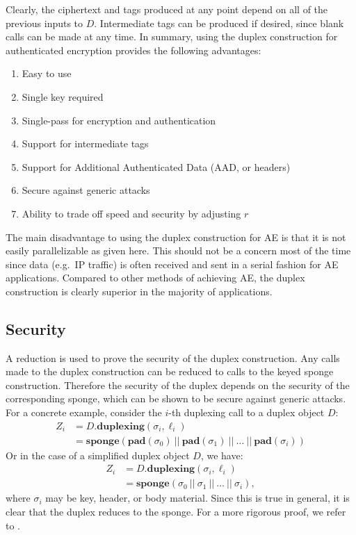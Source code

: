 Clearly, the ciphertext and tags produced at any point depend on all of the previous inputs to $D$.
Intermediate tags can be produced if desired, since blank calls can be made at any time.
In summary, using the duplex construction for authenticated encryption provides the following advantages:
\begin{enumerate}
\item Easy to use
\item Single key required
\item Single-pass for encryption and authentication
\item Support for intermediate tags
\item Support for Additional Authenticated Data (AAD, or headers)
\item Secure against generic attacks
\item Ability to trade off speed and security by adjusting $r$
\end{enumerate}
The main disadvantage to using the duplex construction for AE is that it is not easily parallelizable as given here.
This should not be a concern most of the time since data (e.g.\ IP traffic) is often received and sent in a serial fashion for AE applications.
Compared to other methods of achieving AE, the duplex construction is clearly superior in the majority of applications.

\subsection{Security}
\label{sec:DuplexSecurity}
A reduction is used to prove the security of the duplex construction.
Any calls made to the duplex construction can be reduced to calls to the keyed sponge construction.
Therefore the security of the duplex depends on the security of the corresponding sponge, which can be shown to be secure against generic attacks.
For a concrete example, consider the $i$-th duplexing call to a duplex object $D$:
\begin{align*}
Z_i &= D.\mathbf{duplexing}(\sigma_i,\ell_i) \\
&= \mathbf{sponge}(\mathbf{pad}(\sigma_0)\ ||\ \mathbf{pad}(\sigma_1)\ ||\ \dots\ ||\ \mathbf{pad}(\sigma_i))
\end{align*}
Or in the case of a simplified duplex object $D$, we have:
\begin{align*}
Z_i &= D.\mathbf{duplexing}(\sigma_i,\ell_i) \\
&= \mathbf{sponge}(\sigma_0\ ||\ \sigma_1\ ||\ \dots\ ||\ \sigma_i),
\end{align*}
where $\sigma_i$ may be key, header, or body material.
Since this is true in general, it is clear that the duplex reduces to the sponge.
For a more rigorous proof, we refer to \cite{Bertoni2012_Duplexing}.

